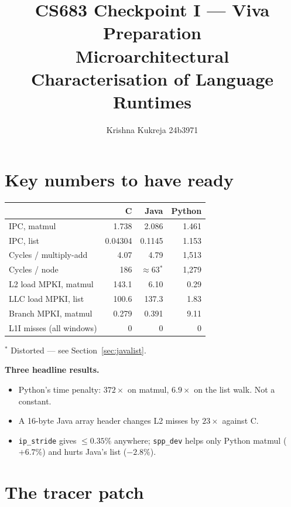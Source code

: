 \documentclass[11pt,a4paper]{article}
\title{CS683 Checkpoint I --- Viva Preparation\\
\large Microarchitectural Characterisation of Language Runtimes}
\author{Krishna Kukreja \quad 24b3971}
\date{}
\begin{document}
\maketitle
\tableofcontents
\bigskip

\section{Key numbers to have ready}

\begin{center}
\begin{tabular}{lrrr}
\toprule
& \textbf{C} & \textbf{Java} & \textbf{Python} \\
\midrule
IPC, matmul            & 1.738   & 2.086  & 1.461 \\
IPC, list              & 0.04304 & 0.1145 & 1.153 \\
Cycles / multiply-add  & 4.07    & 4.79   & 1{,}513 \\
Cycles / node          & 186     & $\approx$63$^{*}$ & 1{,}279 \\
L2 load MPKI, matmul   & 143.1   & 6.10   & 0.29 \\
LLC load MPKI, list    & 100.6   & 137.3  & 1.83 \\
Branch MPKI, matmul    & 0.279   & 0.391  & 9.11 \\
L1I misses (all windows) & 0     & 0      & 0 \\
\bottomrule
\end{tabular}
\end{center}

\noindent$^{*}$ Distorted --- see Section~\ref{sec:javalist}.

\medskip
\noindent\textbf{Three headline results.}
\begin{itemize}[leftmargin=*,nosep]
  \item Python's time penalty: $372\times$ on matmul, $6.9\times$ on the list walk. Not a constant.
  \item A 16-byte Java array header changes L2 misses by $23\times$ against C.
  \item \texttt{ip\_stride} gives $\le 0.35\%$ anywhere; \texttt{spp\_dev} helps only Python matmul ($+6.7\%$) and hurts Java's list ($-2.8\%$).
\end{itemize}

\section{The tracer patch}
\end{document}
